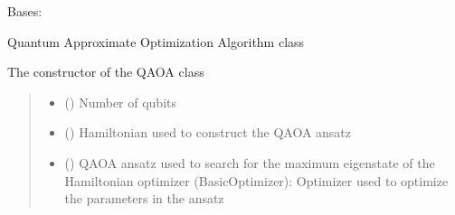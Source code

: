 \documentclass[letterpaper,10pt,english]{sphinxmanual}
\begin{document}

\begin{fulllineitems}
\label{\detokenize{qcompute_qapp.algorithm:qcompute_qapp.algorithm.QAOA}}
\pysigstartsignatures
{}
\pysigstopsignatures
\sphinxAtStartPar
Bases: 

\sphinxAtStartPar
Quantum Approximate Optimization Algorithm class

\sphinxAtStartPar
The constructor of the QAOA class
\begin{quote}\begin{description}
\begin{itemize}
\item {} 
\sphinxAtStartPar
{} () \textendash{} Number of qubits

\item {} 
\sphinxAtStartPar
{} () \textendash{} Hamiltonian used to construct the QAOA ansatz

\item {} 
\sphinxAtStartPar
{} ({\hyperref[\detokenize{qcompute_qapp.circuit:qcompute_qapp.circuit.QAOAAnsatz}]{}}) \textendash{} QAOA ansatz used to search for the maximum eigenstate of the Hamiltonian
optimizer (BasicOptimizer): Optimizer used to optimize the parameters in the ansatz


\end{itemize}
\end{description}
\end{quote}
\end{fulllineitems}
\end{document}
